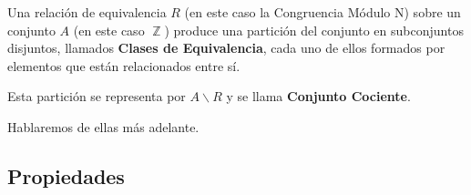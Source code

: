 \documentclass[12pt, fleqn]{report}                             %
\DeclareMathOperator \Integers  {\mathbb{Z}}                     %
\begin{document}
            Una relación de equivalencia $R$ (en este caso la Congruencia Módulo N)
            sobre un conjunto $A$ (en este caso $\Integers$) produce una partición
            del conjunto en subconjuntos disjuntos, llamados \textbf{Clases de
            Equivalencia}, cada uno de ellos formados por elementos que están
            relacionados entre sí.

            Esta partición se representa por $A \backslash R$ y se llama
            \textbf{Conjunto Cociente}.

            Hablaremos de ellas más adelante.



        \clearpage
        \subsection{Propiedades}
\end{document}
